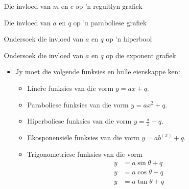 \begin{Ondersoek}{Die invloed van $m$ en $c$ op 'n reguitlyn grafiek}
\begin{Ondersoek}{Die invloed van $a$ en $q$ op 'n paraboliese grafiek}
\begin{Ondersoek}{Ondersoek die invloed van $a$ en $q$ op 'n hiperbool}
\begin{Ondersoek}{Ondersoek die invloed van $a$ en $q$ op die exponent grafiek}
\begin{itemize}[noitemsep]
Interval notasie: hier skryf ons ’n interval in die vorm ’laer hakie, laer getal, kommapunt, hoër getal, hoër
hakie’
\item  Jy moet die volgende funksies en hulle eienskappe ken:
    \begin{itemize}[noitemsep]
    \item Line\^re funksies van die vorm $y=ax+q$. 
    \item Paraboliese funksies van die vorm $y=a{x}^{2}+q$.
    \item Hiperboliese funksies van die vorm $y=\frac{a}{x}+q$. 
    \item Ekosponensi\"ele funksies van die vorm $y=a{b}^{(x)}+q$. 
    \item Trigonometriese funksies van die vorm 
    \begin{align*} 
    y&=a\sin\theta + q \\
    y&=a\cos\theta +q \\
    y&=a\tan\theta +q \\
    \end{align*}
    \end{itemize}
\end{itemize}


\end{Ondersoek}
\end{Ondersoek}
\end{Ondersoek}
\end{Ondersoek}
